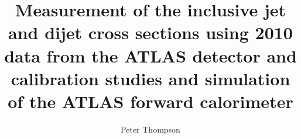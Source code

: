 
\author{Peter Thompson}
\title{Measurement of the inclusive jet and dijet cross sections using 2010 data from the ATLAS detector and calibration studies and simulation of the ATLAS forward calorimeter}



%
\setcounter{tocdepth}{2}
\setcounter{secnumdepth}{3}



%



